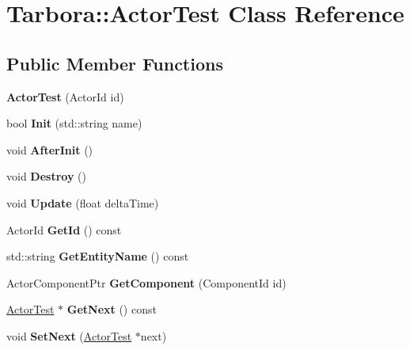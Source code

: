 \hypertarget{classTarbora_1_1ActorTest}{}\section{Tarbora\+:\+:Actor\+Test Class Reference}
\label{classTarbora_1_1ActorTest}
\subsection*{Public Member Functions}
\begin{DoxyCompactItemize}
\item 
\mbox{\label{classTarbora_1_1ActorTest_ad457e844af597ea30074df91d60d628c}} 
{\bfseries Actor\+Test} (Actor\+Id id)
\item 
\mbox{\label{classTarbora_1_1ActorTest_a32a0ca412282137a1cd55f1838edf2ac}} 
bool {\bfseries Init} (std\+::string name)
\item 
\mbox{\label{classTarbora_1_1ActorTest_ad2e97ec6385c50cfb66078bdcc5d952d}} 
void {\bfseries After\+Init} ()
\item 
\mbox{\label{classTarbora_1_1ActorTest_a21c45d268e7d3a8f4f6fc059d8d66a92}} 
void {\bfseries Destroy} ()
\item 
\mbox{\label{classTarbora_1_1ActorTest_a363465e2cc6e35bc8a6d8fce27a132e1}} 
void {\bfseries Update} (float delta\+Time)
\item 
\mbox{\label{classTarbora_1_1ActorTest_a5c561bad40317d007cc45e9857341c13}} 
Actor\+Id {\bfseries Get\+Id} () const
\item 
\mbox{\label{classTarbora_1_1ActorTest_a7d4243ecfad2a7d24e7a36d69e6bcbe2}} 
std\+::string {\bfseries Get\+Entity\+Name} () const
\item 
\mbox{\label{classTarbora_1_1ActorTest_aba485020e32f40d814aa9573d540de73}} 
Actor\+Component\+Ptr {\bfseries Get\+Component} (Component\+Id id)
\item 
\mbox{\label{classTarbora_1_1ActorTest_a98299208ea87526838a5f218e28cd447}} 
\hyperlink{classTarbora_1_1ActorTest}{Actor\+Test} $\ast$ {\bfseries Get\+Next} () const
\item 
\mbox{\label{classTarbora_1_1ActorTest_affe274cb45db8c34aa7edc562964a678}} 
void {\bfseries Set\+Next} (\hyperlink{classTarbora_1_1ActorTest}{Actor\+Test} $\ast$next)
\end{DoxyCompactItemize}
